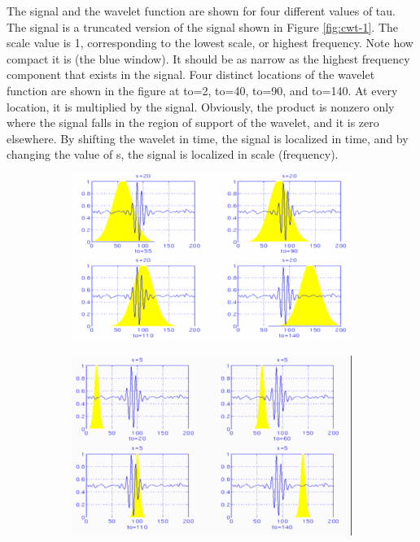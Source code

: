 \documentclass[12pt, a4paper, twoside]{report}
\begin{document}
The signal and the wavelet function are shown for four different values of tau. The signal is a truncated version of the signal shown in Figure \ref{fig:cwt-1}. The scale value is 1, corresponding to the lowest scale, or highest frequency. Note how compact it is (the blue window). It should be as narrow as the highest frequency component that exists in the signal. Four distinct locations of the wavelet function are shown in the figure at to=2, to=40, to=90, and to=140. At every location, it is multiplied by the signal. Obviously, the product is nonzero only where the signal falls in the region of support of the wavelet, and it is zero elsewhere. By shifting the wavelet in time, the signal is localized in time, and by changing the value of s, the signal is localized in scale (frequency).
\begin{figure}[H]
    \centering
    \begin{subfigure}[b]{0.6\textwidth}
        \includegraphics[width=\textwidth]
        {images/chapter3/cwt-scale-wide}
        \caption{}
        \label{fig:cwt-scale-wide}
    \end{subfigure}

    \begin{subfigure}[b]{0.6\textwidth}
        \includegraphics[width=\textwidth]
        {images/chapter3/cwt-scale-narrow}
        \caption{}
        \label{fig:cwt-scale-narrow}
    \end{subfigure}
    \caption{}
    \label{fig:cwt-scale-comparison}
\end{figure}
\end{document}
